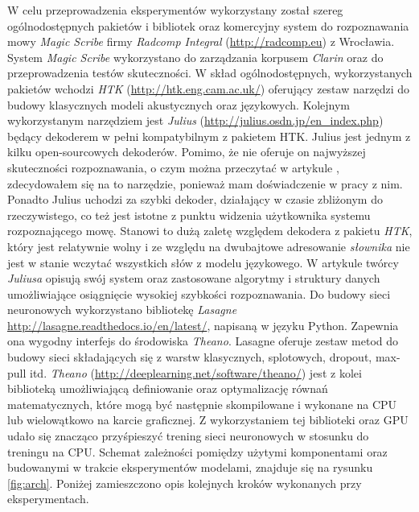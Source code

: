 \documentclass[shortabstract, mgr]{iithesis}
\begin{document}
	W celu przeprowadzenia eksperymentów wykorzystany został szereg ogólnodostępnych pakietów i bibliotek oraz komercyjny system do rozpoznawania mowy \textit{Magic Scribe} firmy \textit{Radcomp Integral} (\url{http://radcomp.eu}) z Wrocławia. System \textit{Magic Scribe} wykorzystano do zarządzania korpusem \textit{Clarin} oraz do przeprowadzenia testów skuteczności. W skład ogólnodostępnych, wykorzystanych pakietów wchodzi \textit{HTK} (\url{http://htk.eng.cam.ac.uk/}) oferujący zestaw narzędzi do budowy klasycznych modeli akustycznych oraz językowych. Kolejnym wykorzystanym narzędziem jest \textit{Julius} (\url{http://julius.osdn.jp/en_index.php}) będący dekoderem w pełni kompatybilnym z pakietem HTK. Julius jest jednym z kilku open-sourcowych dekoderów. Pomimo, że nie oferuje on najwyższej skuteczności rozpoznawania, o czym można przeczytać w artykule \cite{asr_toolkit_cmp}, zdecydowałem się na to narzędzie, ponieważ mam doświadczenie w pracy z nim. Ponadto Julius uchodzi za szybki dekoder, działający w czasie zbliżonym do rzeczywistego, co też jest istotne z punktu widzenia użytkownika systemu rozpoznającego mowę. Stanowi to dużą zaletę względem dekodera z pakietu \textit{HTK}, który jest relatywnie wolny i ze względu na dwubajtowe adresowanie \textit{słownika} nie jest w stanie wczytać wszystkich słów z modelu językowego. W artykule \cite{julius} twórcy \textit{Juliusa} opisują swój system oraz zastosowane algorytmy i struktury danych umożliwiające osiągnięcie wysokiej szybkości rozpoznawania. Do budowy sieci neuronowych wykorzystano bibliotekę \textit{Lasagne} \url{http://lasagne.readthedocs.io/en/latest/}, napisaną w języku Python. Zapewnia ona wygodny interfejs do środowiska \textit{Theano}. Lasagne oferuje zestaw metod do budowy sieci składających się z warstw klasycznych, splotowych, dropout, max-pull itd. \textit{Theano} (\url{http://deeplearning.net/software/theano/}) jest z kolei biblioteką umożliwiającą definiowanie oraz optymalizację równań matematycznych, które mogą być następnie skompilowane i wykonane na CPU lub wielowątkowo na karcie graficznej. Z wykorzystaniem tej biblioteki oraz GPU udało się znacząco przyśpieszyć trening sieci neuronowych w stosunku do treningu na CPU. Schemat zależności pomiędzy użytymi komponentami oraz budowanymi w trakcie eksperymentów modelami, znajduje się na rysunku \ref{fig:arch}. Poniżej zamieszczono opis kolejnych kroków wykonanych przy eksperymentach.
	
\end{document}
